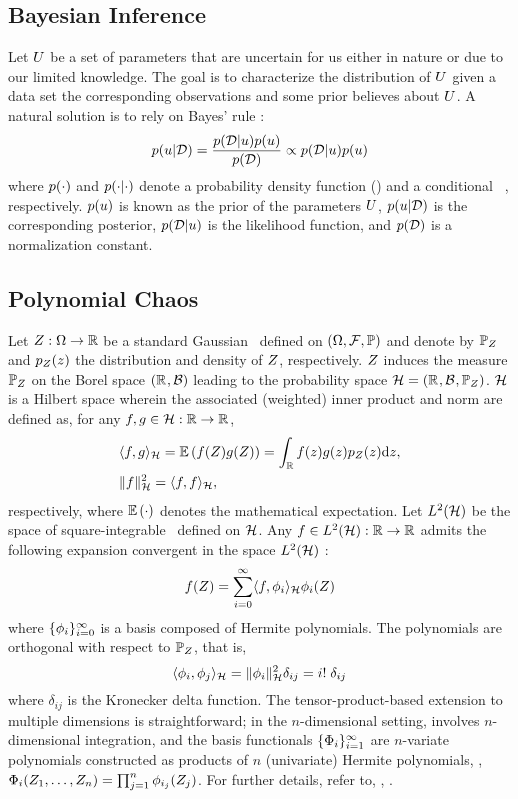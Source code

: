 \subsection{Bayesian Inference}
Let $U$ be a set of parameters that are uncertain for us either in nature or due to our limited knowledge. The goal is to characterize the distribution of $U$ given a data set the corresponding observations and some prior believes about $U$. A natural solution is to rely on Bayes' rule \cite{gelman2004}:
\begin{equation} \elabel{bayes}
  \f{\u | \data} = \frac{\f{\data | \u} \f{\u}}{\f{\data}} \propto \f{\data | \u} \f{\u}
\end{equation}
where $\f{\cdot}$ and $\f{\cdot | \cdot}$ denote a probability density function (\pdf) and a conditional \pdf\ \cite{durrett2010}, respectively. $\f{\u}$ is known as the prior of the parameters $U$, $\f{\u | \data}$ is the corresponding posterior, $\f{\data | \u}$ is the likelihood function, and $\f{\data}$ is a normalization constant.

\subsection{Polynomial Chaos}
Let $Z: \Omega \to \mathbb{R}$ be a standard Gaussian \rv\ defined on $(\Omega, \mathcal{F}, \mathbb{P})$ and denote by $\mathbb{P}_Z$ and $\f{\Z}{\z}$ the distribution and density of $Z$, respectively. $Z$ induces the measure $\mathbb{P}_Z$ on the Borel space $(\mathbb{R}^{}, \mathcal{B})$ leading to the probability space $\mathcal{H} = (\mathbb{R}^{}, \mathcal{B}^{}, \mathbb{P}_Z)$. $\mathcal{H}$ is a Hilbert space wherein the associated (weighted) inner product and norm are defined as, for any $f, g \in \mathcal{H}: \mathbb{R} \to \mathbb{R}$,
\begin{align}
  & \iprod{f, g}_\hilbertSpace = \E{f(\Z) g(\Z)} = \int_\real f(\z) g(\z) \f{\Z}{\z} \d\z, \elabel{inner-product} \\
  & \norm{f}_\hilbertSpace^2 = \iprod{f, f}_\hilbertSpace \nonumber,
\end{align}
respectively, where $\mathbb{E}\left( \cdot \right)$ denotes the mathematical expectation. Let $L^{2}(\mathcal{H})$ be the space of square-integrable \rvs\ defined on $\mathcal{H}$. Any $f \in L^{2}(\mathcal{H}): \mathbb{R} \to \mathbb{R}$ admits the following expansion convergent in the space $L^{2}(\mathcal{H})$ \cite{maitre2010}:
\[
  f(Z) = \sum_{i = 0}^\infty \langle f, \phi_i \rangle_{\mathcal{H}} \phi_i(Z)
\]
where $\{ \phi_i \}_{i = 0}^\infty$ is a basis composed of Hermite polynomials. The polynomials are orthogonal with respect to $\mathbb{P}_Z$, that is,
\[
  \langle \phi_i, \phi_j \rangle_{\mathcal{H}} = \| \phi_i \|_{\mathcal{H}}^2 \delta_{ij} = i! \; \delta_{ij}
\]
where $\delta_{ij}$ is the Kronecker delta function. The tensor-product-based extension to multiple dimensions is straightforward; in the $n$-dimensional setting,  involves $n$-dimensional integration, and the basis functionals $\{ \Phi_i \}_{i = 1}^\infty$ are $n$-variate polynomials constructed as products of $n$ (univariate) Hermite polynomials, \ie, $\Phi_i(Z_1, \dotsc, Z_n) = \prod_{j = 1}^n \phi_{i_j}(Z_j)$. For further details, refer to, \eg, \cite{maitre2010}.

